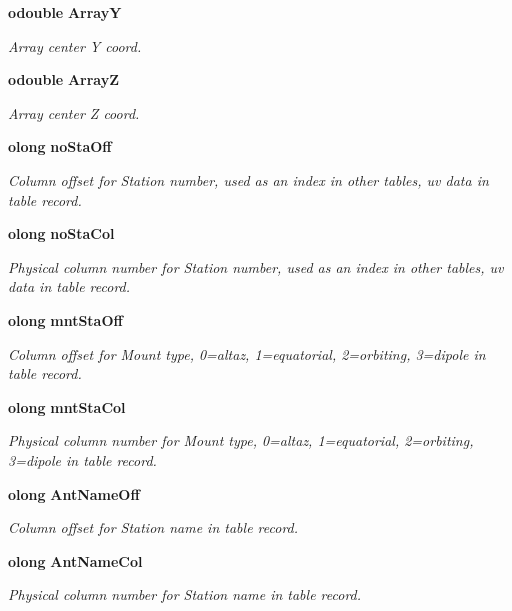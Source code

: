 \begin{CompactItemize}
{\bf odouble} {\bf Array\-Y}
\begin{CompactList}\small\item\em Array center Y coord. \item\end{CompactList}\item 
{\bf odouble} {\bf Array\-Z}
\begin{CompactList}\small\item\em Array center Z coord. \item\end{CompactList}\item 
{\bf olong} {\bf no\-Sta\-Off}
\begin{CompactList}\small\item\em Column offset for Station number, used as an index in other tables, uv data in table record. \item\end{CompactList}\item 
{\bf olong} {\bf no\-Sta\-Col}
\begin{CompactList}\small\item\em Physical column number for Station number, used as an index in other tables, uv data in table record. \item\end{CompactList}\item 
{\bf olong} {\bf mnt\-Sta\-Off}
\begin{CompactList}\small\item\em Column offset for Mount type, 0=altaz, 1=equatorial, 2=orbiting, 3=dipole in table record. \item\end{CompactList}\item 
{\bf olong} {\bf mnt\-Sta\-Col}
\begin{CompactList}\small\item\em Physical column number for Mount type, 0=altaz, 1=equatorial, 2=orbiting, 3=dipole in table record. \item\end{CompactList}\item 
{\bf olong} {\bf Ant\-Name\-Off}
\begin{CompactList}\small\item\em Column offset for Station name in table record. \item\end{CompactList}\item 
{\bf olong} {\bf Ant\-Name\-Col}
\begin{CompactList}\small\item\em Physical column number for Station name in table record. \item\end{CompactList}\item 

\end{CompactItemize}
